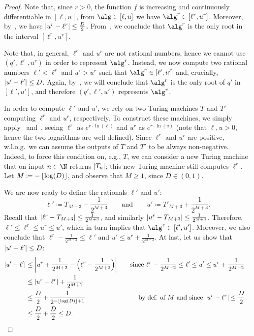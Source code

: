\begin{proof}
  Note that, since $r > 0$, the function $f$ is increasing and continuously
  differentiable in $[\ell,u]$, from $\alg \in [\ell,u]$ we have $\alg^r\in
  [\ell^r,u^r]$. Moreover, by~, 
  we have $\left|u^r-\ell^r\right| \leq \frac{D}{2}$.
  From~, 
  we conclude that $\alg^r$ is the only root in the interval $[\ell^r,u^r]$.

  Note that, in general, $\ell^r$ and $u^r$ are not rational numbers, 
  hence we cannot use $(q',\ell^r,u^r)$ in order to represent $\alg^r$. 
  Instead, we now compute two rational numbers $\ell'<\ell^r$ and $u'>u^r$ 
  such that $\alg^r \in [\ell',u']$ and, crucially, $\left|u'-\ell'\right|\leq D$. 
  Again, by~, we will conclude that 
  $\alg^r$ is the only root of $q'$ in $[\ell',u']$, 
  and therefore $(q',\ell',u')$ represents $\alg^r$.

  In order to compute $\ell'$ and $u'$, we rely on two Turing machines $T$ and
  $T'$ computing $\ell^r$ and $u^r$, respectively. To construct these machines,
  we simply apply~
  and~, seeing $\ell^r$ as $e^{r \cdot
  \ln(\ell)}$ and $u^r$ as $e^{r \cdot \ln(u)}$ (note that $\ell,u > 0$, hence
  the two logarithms are well-defined). Since $\ell^r$ and $u^r$ are positive,
  w.l.o.g.~we can assume the outputs of $T$ and $T'$ to be always non-negative.
  Indeed, to force this condition on, e.g., $T$, we can consider a new Turing
  machine that on input $n \in \N$ returns $\left|T_n\right|$; this new Turing machine
  still computes $\ell^r$.
  Let $M \coloneqq -\left\lfloor\log(D)\right\rfloor$, and observe that $M \geq 1$, since $D \in (0,1)$.
  
  We are now ready to define the rationals $\ell'$ and $u'$: 
  \[ 
    \ell'\coloneqq T_{M+3}-\frac{1}{2^{M+3}}
    \qquad\text{and}\qquad 
    u'\coloneqq T'_{M+3}+\frac{1}{2^{M+3}}.
  \]
  Recall that $\left|\ell^r-T_{M+3}\right| \leq \frac{1}{2^{M+3}}$, and similarly
  $\left|u^r-T_{M+3}\right| \leq \frac{1}{2^{M+3}}$. Therefore, $\ell' \leq \ell^r \leq u^r \leq u'$, which in turn implies that $\alg^r \in [\ell',u']$. Moreover,
  we also conclude that $\ell^r-\frac{1}{2^{M+2}} \leq \ell'$ and $u'\leq
  u^r+\frac{1}{2^{M+2}}$.
  At last, let us show that $\left|u'-\ell'\right| \leq D$:
  \begin{align*}
    \left|u'-\ell'\right|&\leq \left|u^r+\frac{1}{2^{M+2}}-\Big(\ell^r-\frac{1}{2^{M+2}}\Big)\right|
    &\quad\text{since $\ell^r-\frac{1}{2^{M+2}} \leq \ell' \leq u'\leq
  u^r+\frac{1}{2^{M+2}}$}\\
    &\leq\left|u^r-\ell^r\right|+\frac{1}{2^{M+1}}\\
    &\leq \frac{D}{2} + \frac{1}{2^{-\left\lfloor\log(D)\right\rfloor+1}}
    &\text{by def.~of~$M$ and since~$\left|u^r-\ell^r\right| \leq \frac{D}{2}$}\\ 
    &\leq \frac{D}{2} + \frac{D}{2} \leq D.
    &&\qedhere
  \end{align*}
\end{proof}

